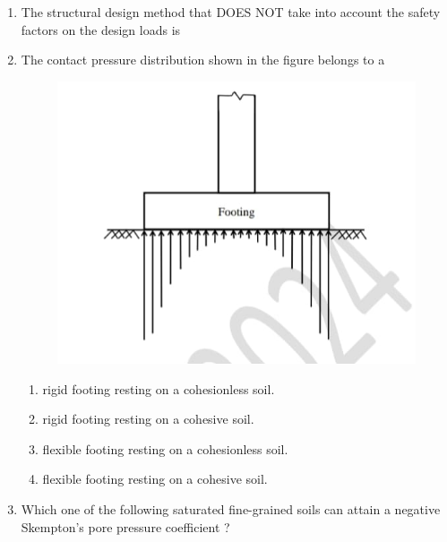 \documentclass[journal,12pt,onecolumn]{article}
\theoremstyle{remark}
\begin{document}
\begin{enumerate}
    \item The structural design method that DOES NOT take into account the safety factors
    on the design loads is
    
    \hfill{}
    \begin{enumerate}
    \end{enumerate}
    
    \item The contact pressure distribution shown in the figure  belongs to a
    \begin{figure}[H]
        \centering
        \includegraphics[width=0.7\columnwidth]{figs/2Q22.jpg}
        \caption{}
        \label{fig:q22}
    \end{figure}
    
    \hfill{}
    \begin{enumerate}
        \item rigid footing resting on a cohesionless soil.
        \item rigid footing resting on a cohesive soil.
        \item flexible footing resting on a cohesionless soil.
        \item flexible footing resting on a cohesive soil.
    \end{enumerate}

    \item Which one of the following saturated fine-grained soils can attain a negative
    Skempton's pore pressure coefficient ?
    

\end{enumerate}
\end{document}
